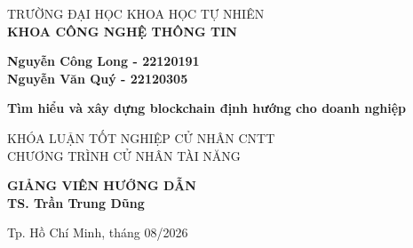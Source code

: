\begin{titlepage}
{ %
\fontsize{18pt}{22pt}\selectfont

\begin{center}

TRƯỜNG ĐẠI HỌC KHOA HỌC TỰ NHIÊN\\
\textbf{KHOA CÔNG NGHỆ THÔNG TIN}
\vspace{3cm}

{\fontsize{22pt}{26pt}\selectfont
\textbf{Nguyễn Công Long \hspace{0.4cm}- 22120191} \\ 
\textbf{Nguyễn Văn Quý - 22120305} \\
}
\vspace{3cm}

{ \fontsize{26pt}{30pt}\selectfont
\textbf{Tìm hiểu và xây dựng blockchain định hướng cho doanh nghiệp}
}
\vspace{2cm}

KHÓA LUẬN TỐT NGHIỆP CỬ NHÂN CNTT\\
CHƯƠNG TRÌNH CỬ NHÂN TÀI NĂNG
\vspace{2cm}

\textbf{GIẢNG VIÊN HƯỚNG DẪN}\\
\vspace{0.2cm}
{\fontsize{22pt}{26pt}\selectfont
\textbf{TS. Trần Trung Dũng}
}


\vfill
Tp. Hồ Chí Minh, tháng 08/2026

\end{center}

} %

\end{titlepage}

